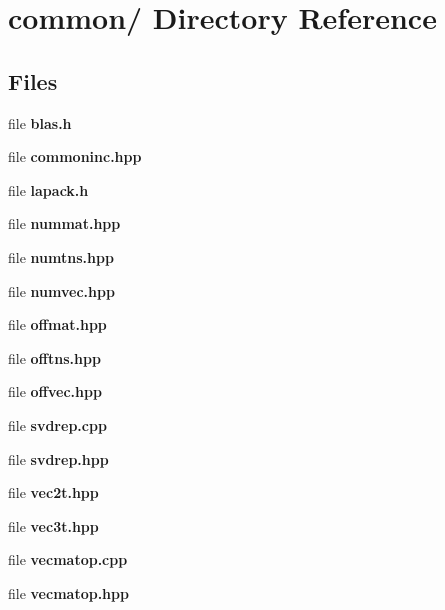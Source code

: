 \section{common/ Directory Reference}
\label{dir__2Fharper_2Fkifmm3d_2Fcommon_2F}


\subsection*{Files}
\begin{CompactItemize}
\item 
file {\bf blas.h}
\item 
file {\bf commoninc.hpp}
\item 
file {\bf lapack.h}
\item 
file {\bf nummat.hpp}
\item 
file {\bf numtns.hpp}
\item 
file {\bf numvec.hpp}
\item 
file {\bf offmat.hpp}
\item 
file {\bf offtns.hpp}
\item 
file {\bf offvec.hpp}
\item 
file {\bf svdrep.cpp}
\item 
file {\bf svdrep.hpp}
\item 
file {\bf vec2t.hpp}
\item 
file {\bf vec3t.hpp}
\item 
file {\bf vecmatop.cpp}
\item 
file {\bf vecmatop.hpp}
\end{CompactItemize}
